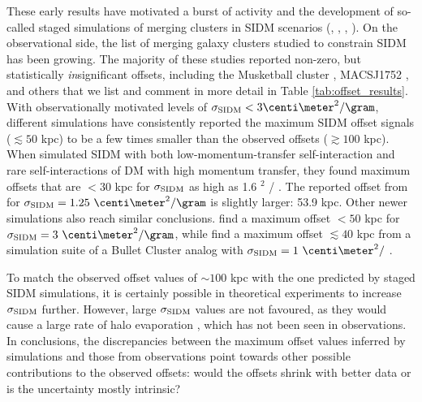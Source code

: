 \documentclass[usenatbib]{mn2e}
\newcommand{\ap}[1]{\textcolor{cyan}{#1}}
\newcommand{\sigmaSIDM}{\sigma_{\rm SIDM}}
\begin{document}
These early results have motivated a burst of activity and the development of so-called staged simulations of merging clusters in SIDM scenarios (\citealt{Randall2008d}, \citealt{Kahlhoefer14}, \citealt{Robertson2016}, \citealt{Kim:2016}).
%
On the observational side, the list of merging galaxy 
clusters studied to constrain SIDM has been growing. 
The majority of these studies reported non-zero,
but statistically {\it in}significant offsets, including the Musketball cluster
\citep{Dawson2013}, MACSJ1752 \citep{Jee2015}, 
and others that we list and comment in more detail in Table \ref{tab:offset_results}.
%
With observationally motivated 
levels of $ \sigmaSIDM < 3 \centi\meter^2 / \gram$, different simulations have consistently reported the maximum SIDM offset 
signals ($\lesssim 50$ kpc) to be a few times smaller than the observed offsets 
($ \gtrsim 100$ kpc).  When \cite{Kahlhoefer14} simulated SIDM with both low-momentum-transfer 
self-interaction and rare self-interactions of DM with high momentum transfer, they found maximum 
offsets that are $< 30$ kpc for $\sigmaSIDM$ as high as 1.6 \centi\meter$^2$ / \gram.
The reported offset from \cite{Randall2008d} for $\sigmaSIDM = 1.25~\centi\meter^2 / \gram$ is slightly larger: 53.9 kpc. 
Other newer simulations also reach similar conclusions.
\cite{Kim:2016} find a maximum offset $< 50$ kpc for 
$\sigmaSIDM = 3~\centi\meter^2 / \gram$, while
\cite{Robertson2016} find a maximum offset $\lesssim 40$ kpc  
 from a simulation suite of a Bullet Cluster analog 
 with $\sigmaSIDM = 1~\centi\meter^2 /$ \gram.
 
To match the observed offset values of $\sim 100$ kpc with the one predicted by staged SIDM simulations, it is certainly possible in theoretical experiments
to increase $\sigmaSIDM$ further. However, large $\sigmaSIDM$ values are not favoured, as they would cause a large rate of halo evaporation \citep{Kim:2016}, which has not been seen in observations. 
In conclusions, the discrepancies between the maximum offset values inferred by simulations and those from observations point towards other possible contributions to the
observed offsets: would the offsets shrink with better data or is the uncertainty mostly intrinsic? 
\end{document}
